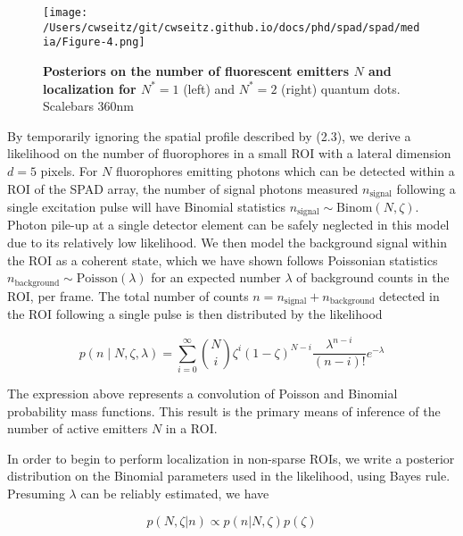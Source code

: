 \begin{figure}[t]
\centering
\texttt{[image: /Users/cwseitz/git/cwseitz.github.io/docs/phd/spad/spad/media/Figure-4.png]}
\caption{\textbf{Posteriors on the number of fluorescent emitters $N$ and localization for $N^{*}=1$} (left) and $N^{*}=2$ (right) quantum dots. Scalebars 360nm}
\label{fig:fig7}
\end{figure}   

By temporarily ignoring the spatial profile described by (2.3), we derive a likelihood on the number of fluorophores in a small ROI with a lateral dimension $d = 5$ pixels. For $N$ fluorophores emitting photons which can be detected within a ROI of the SPAD array, the number of signal photons measured $n_{\mathrm{signal}}$ following a single excitation pulse will have Binomial statistics $n_{\mathrm{signal}} \sim \mathrm{Binom}(N,\zeta)$. Photon pile-up at a single detector element can be safely neglected in this model due to its relatively low likelihood. We then model the background signal within the ROI as a coherent state, which we have shown follows Poissonian statistics $n_{\mathrm{background}} \sim \mathrm{Poisson}(\lambda)$ for an expected number $\lambda$ of background counts in the ROI, per frame. The total number of counts $n=n_{\mathrm{signal}}+n_{\mathrm{background}}$ detected in the ROI following a single pulse is then distributed by the likelihood

\begin{equation}
p(n \mid N,\zeta,\lambda) = \sum_{i=0}^{\infty} \binom{N}{i} \zeta^i (1-\zeta)^{N-i} \frac{\lambda^{n-i}}{(n-i)!} e^{-\lambda}
\end{equation}

The expression above represents a convolution of Poisson and Binomial probability mass functions. This result is the primary means of inference of the number of active emitters $N$ in a ROI.

In order to begin to perform localization in non-sparse ROIs, we write a posterior distribution on the Binomial parameters used in the likelihood, using Bayes rule. Presuming $\lambda$ can be reliably estimated, we have

\begin{equation}
p(N,\zeta\lvert n) \propto p(n\lvert N,\zeta)p(\zeta)
\end{equation}

